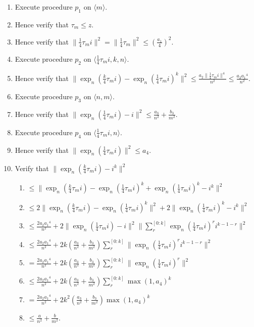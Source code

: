 \documentclass{article}
\newcounter{procedure}[part]
\begin{document}
\begin{multicols}{2}
\begin{enumerate}
\begin{enumerate}
						\item Execute procedure $p_1$ on $\langle m\rangle$.
						\item Hence verify that $\tau_m\le z$.
						\item Hence verify that $\lVert\frac{1}{4}\tau_m i\rVert^2=\lVert\frac{1}{4}\tau_m\rVert^2\le(\frac{a_1}{4})^2$.
						\item Execute procedure $p_2$ on $\langle\frac{1}{4}\tau_m i,k,n\rangle$.
						\item Hence verify that $\lVert\exp_n(\frac{k}{4}\tau_m i)-\exp_n(\frac{1}{4}\tau_m i)^k\rVert^2\le\frac{a_2\lVert\frac{1}{4}\tau_m i\rVert^4}{n^2}\le\frac{a_2{a_1}^4}{n^2}$.
						\item Execute procedure $p_3$ on $\langle n,m\rangle$.
						\item Hence verify that $\lVert\exp_n(\frac{1}{4}\tau_m i)-i\rVert^2\le\frac{a_3}{n^2}+\frac{b_3}{m^2}$.
						\item Execute procedure $p_4$ on $\langle\frac{1}{4}\tau_m i,n\rangle$.
						\item Hence verify that $\lVert\exp_n(\frac{1}{4}\tau_m i)\rVert^2\le a_4$.
						\item Verify that $\lVert\exp_n(\frac{k}{4}\tau_m i)-i^k\rVert^2$
						\begin{enumerate}
							\item $\le\lVert\exp_n(\frac{k}{4}\tau_m i)-\exp_n(\frac{1}{4}\tau_m i)^k+\exp_n(\frac{1}{4}\tau_m i)^k-i^k\rVert^2$
							\item $\le 2\lVert\exp_n(\frac{k}{4}\tau_m i)-\exp_n(\frac{1}{4}\tau_m i)^k\rVert^2+2\lVert\exp_n(\frac{1}{4}\tau_m i)^k-i^k\rVert^2$
							\item $\le\frac{2a_2{a_1}^4}{n^2}+2\lVert\exp_n(\frac{1}{4}\tau_m i)-i\rVert^2\lVert\sum_r^{[0:k]}\exp_n(\frac{1}{4}\tau_m i)^ri^{k-1-r}\rVert^2$
							\item $\le\frac{2a_2{a_1}^4}{n^2}+2k(\frac{a_3}{n^2}+\frac{b_3}{m^2})\sum_r^{[0:k]}\lVert\exp_n(\frac{1}{4}\tau_m i)^ri^{k-1-r}\rVert^2$
							\item $=\frac{2a_2{a_1}^4}{n^2}+2k(\frac{a_3}{n^2}+\frac{b_3}{m^2})\sum_r^{[0:k]}\lVert\exp_n(\frac{1}{4}\tau_m i)^r\rVert^2$
							\item $\le\frac{2a_2{a_1}^4}{n^2}+2k(\frac{a_3}{n^2}+\frac{b_3}{m^2})\sum_r^{[0:k]}\max(1,a_4)^k$
							\item $=\frac{2a_2{a_1}^4}{n^2}+2k^2(\frac{a_3}{n^2}+\frac{b_3}{m^2})\max(1,a_4)^k$
							\item $\le\frac{a}{n^2}+\frac{b}{m^2}$.

\end{enumerate}
\end{enumerate}
\end{enumerate}
\end{multicols}
\end{document}
